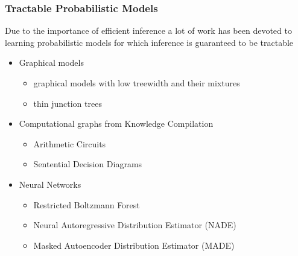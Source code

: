 \documentclass[10pt, t, xcolor={usenames,dvipsnames,svgnames}, compress]{beamer}
\begin{document}
\begin{frame}
  \frametitle{Tractable Probabilistic Models}
Due to the importance of efficient inference a lot of work has been devoted to
learning probabilistic models for which inference is guaranteed to be tractable 
\begin{itemize}
\item Graphical models
  \begin{itemize}
  \item  graphical models with low treewidth and their mixtures
  \item thin junction trees
  \end{itemize}
\item Computational graphs from Knowledge Compilation
\begin{itemize}
\item Arithmetic Circuits
\item Sentential Decision Diagrams
\end{itemize}
\item Neural Networks
\begin{itemize}
\item Restricted Boltzmann Forest 
\item Neural Autoregressive Distribution Estimator (NADE)
\item Masked Autoencoder Distribution Estimator (MADE)
\end{itemize}
\end{itemize}
\end{frame}
\end{document}
